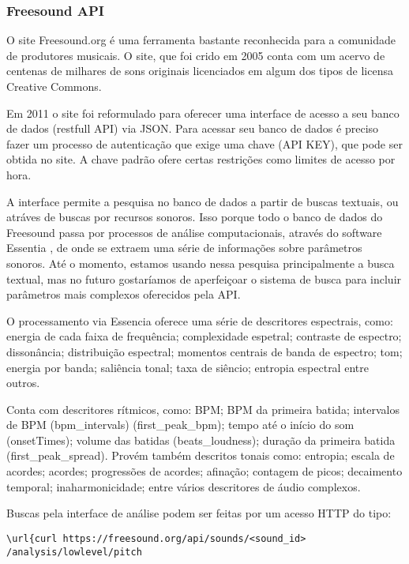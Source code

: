 \subsubsection{Freesound API}
O site Freesound.org \cite{Font2013} é uma ferramenta bastante reconhecida para a comunidade de produtores musicais. O site, que foi crido em 2005 conta com um acervo de centenas de milhares de sons originais licenciados em algum dos tipos de licensa Creative Commons. 

Em 2011 o site foi reformulado para oferecer uma interface de acesso a seu banco de dados (restfull API) \cite{Akkermans2011} via JSON. Para acessar seu banco de dados é preciso fazer um processo de autenticação que exige uma chave (API KEY), que pode ser obtida no site. A chave padrão ofere certas restrições como limites de acesso por hora. 

A interface permite a pesquisa no banco de dados a partir de buscas textuais, ou atráves de buscas por recursos sonoros. Isso porque todo o banco de dados do Freesound passa por processos de análise computacionais, através do software Essentia \cite{Bogdanov2013}, de onde se extraem uma série de informações sobre parâmetros sonoros. Até o momento, estamos usando nessa pesquisa principalmente a busca textual, mas no futuro gostaríamos de aperfeiçoar o sistema de busca para incluir parâmetros mais complexos oferecidos pela API.

O processamento via Essencia oferece uma série de descritores espectrais, como: energia de cada faixa de frequência; complexidade espetral; contraste de espectro; dissonância; distribuição espectral; momentos centrais de banda de espectro; tom; energia por banda; saliência tonal; taxa de siêncio; entropia espectral entre outros.

Conta com descritores rítmicos, como: BPM; BPM da primeira batida; intervalos de BPM (bpm\_intervals) (first\_peak\_bpm); tempo até o início do som (onsetTimes); volume das batidas (beats\_loudness); duração da primeira batida (first\_peak\_spread). Provém também descritos tonais como: entropia; escala de acordes; acordes; progressões de acordes; afinação; contagem de picos; decaimento temporal; inaharmonicidade; entre vários descritores de áudio complexos.

Buscas pela interface de análise podem ser feitas por um acesso HTTP do tipo:

\begin{verbatim}
\url{curl https://freesound.org/api/sounds/<sound_id>
/analysis/lowlevel/pitch
\end{verbatim}

